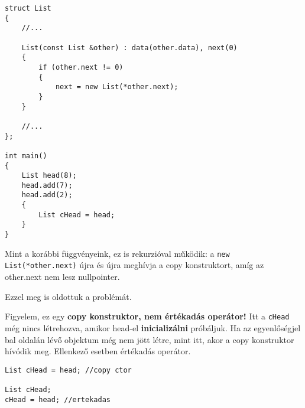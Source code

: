 \documentclass[a4paper,11.5pt]{article}
\begin{document}
	
\begin{lstlisting}
struct List
{
	//...
	
	List(const List &other) : data(other.data), next(0)
	{
		if (other.next != 0)
		{
			next = new List(*other.next);
		}
	}
	
	//...
};

int main()
{
	List head(8);
	head.add(7);
	head.add(2);
	{
		List cHead = head;
	}
}
\end{lstlisting}
	Mint a korábbi függvényeink, ez is rekurzióval működik: a \texttt{new List(*other.next)} újra és újra meghívja a copy konstruktort, amíg az other.next nem lesz nullpointer.
	\begin{center}
	\end{center}
	
	\medskip
	Ezzel meg is oldottuk a problémát. 
	
	Figyelem, ez egy \textbf{copy konstruktor, nem értékadás operátor!} Itt a \texttt{cHead} még nincs létrehozva, amikor head-el \textbf{inicializálni} próbáljuk. Ha az egyenlőségjel bal oldalán lévő objektum még nem jött létre, mint itt, akor a copy konstruktor hívódik meg. Ellenkező esetben értékadás operátor.
	\begin{lstlisting}
List cHead = head; //copy ctor

List cHead;
cHead = head; //ertekadas
	\end{lstlisting}
	
\end{document}
